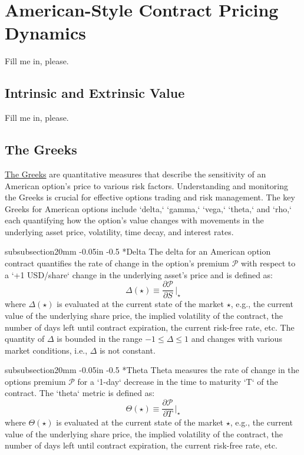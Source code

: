 \documentclass[11pt]{article}
\makeatletter
\theoremstyle{definition}
\renewcommand\subsubsection{\@startsection
	{subsubsection}{2}{0mm}
	{-0.05in}
	{-0.5\baselineskip}
	{\normalfont\normalsize\itshape\bfseries}}
\makeatother
\begin{document}
% 

\section*{American-Style Contract Pricing Dynamics}
Fill me in, please.

\subsection{Intrinsic and Extrinsic Value}
Fill me in, please.

\subsection{The Greeks}
\href{https://en.wikipedia.org/wiki/en:Greeks_(finance)?variant=zh-tw}{The Greeks} are quantitative measures that describe the sensitivity of an American option's price to various risk factors. 
Understanding and monitoring the Greeks is crucial for effective options trading and risk management. The key Greeks for American options include `delta,` `gamma,` `vega,` `theta,` and `rho,` each quantifying how the option's value changes with movements in the underlying asset price, 
volatility, time decay, and interest rates.

\subsubsection*{Delta}
The delta for an American option contract quantifies the rate of change in the option's premium $\mathcal{P}$ with respect to a `+1 USD/share` change in the underlying asset's price and is defined as:
\begin{equation}
\Delta(\star) \equiv \frac{\partial\mathcal{P}}{\partial{S}}\,\Biggr|_{\star}
\end{equation}
where $\Delta(\star)$ is evaluated at the current state of the market $\star$, e.g., the current value of the underlying share price, the implied volatility of the contract, the number of days left until contract expiration, 
the current risk-free rate, etc. The quantity of $\Delta$ is bounded in the range $-1\leq\Delta\leq{1}$ and changes with various market conditions, i.e., $\Delta$ is not constant.

\subsubsection*{Theta}
Theta measures the rate of change in the options premium $\mathcal{P}$ for a `1-day` decrease in the time to maturity `T` of the contract. The `theta` metric  is defined as:
\begin{equation}
\Theta(\star) \equiv \frac{\partial\mathcal{P}}{\partial{T}}\,\Biggr|_{\star}
\end{equation}
where $\Theta(\star)$ is evaluated at the current state of the market $\star$, e.g., the current value of the underlying share price, the implied volatility of the contract, the number of days left until contract expiration, 
the current risk-free rate, etc. 
\end{document}
